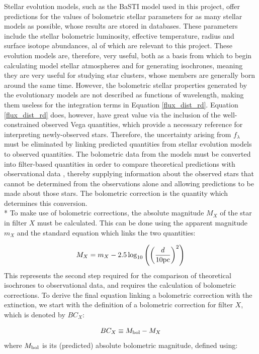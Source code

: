 \documentclass[12pt, a4paper]{report}
\begin{document}
Stellar evolution models, such as the BaSTI model used in this project, offer predictions for the values of bolometric stellar parameters for as many stellar models as possible, whose results are stored in databases. These parameters include the stellar bolometric luminosity, effective temperature, radius and surface isotope abundances, al of which are relevant to this project. These evolution models are, therefore, very useful, both as a basis from which to begin calculating model stellar atmospheres and for generating isochrones, meaning they are very useful for studying star clusters, whose members are generally born around the same time. However, the bolometric stellar properties generated by the evolutionary models are not described as functions of wavelength, making them useless for the integration terms in Equation \ref{flux_dist_rd}. Equation \ref{flux_dist_rd} does, however, have great value via the inclusion of the well-constrained observed Vega quantities, which provide a necessary reference for interpreting newly-observed stars. Therefore, the uncertainty arising from $f_{\lambda}$ must be eliminated by linking predicted quantities from stellar evolution models to observed quantities. The bolometric data from the models must be converted into filter-based quantities in order to compare theoretical predictions with observational data \citep{1996ApJ...469..355F}, thereby supplying information about the observed stars that cannot be determined from the observations alone \citep{2002A&A...391..195G} and allowing predictions to be made about those stars. The bolometric correction is the quantity which determines this conversion.\\*
To make use of bolometric corrections, the absolute magnitude $M_{X}$ of the star in filter $X$ must be calculated. This can be done using the apparent magnitude $m_{X}$ and the standard equation which links the two quantities:

\begin{equation}
M_{X} = m_{X} - 2.5 \log_{10}\left( \left( \frac{d}{10 \textnormal{pc}} \right)^{2} \right)
\label{abs_mag_def}
\end{equation}
This represents the second step required for the comparison of theoretical isochrones to observational data, and requires the calculation of bolometric corrections. To derive the final equation linking a bolometric correction with the extinction, we start with the definition of a bolometric correction for filter $X$, which is denoted by $BC_{X}$:

\begin{equation}
BC_{X} \equiv M_{\textnormal{bol}} - M_{X}
\label{BC_def}
\end{equation}
where $M_{\textnormal{bol}}$ is its (predicted) absolute bolometric magnitude, defined using:
\end{document}
